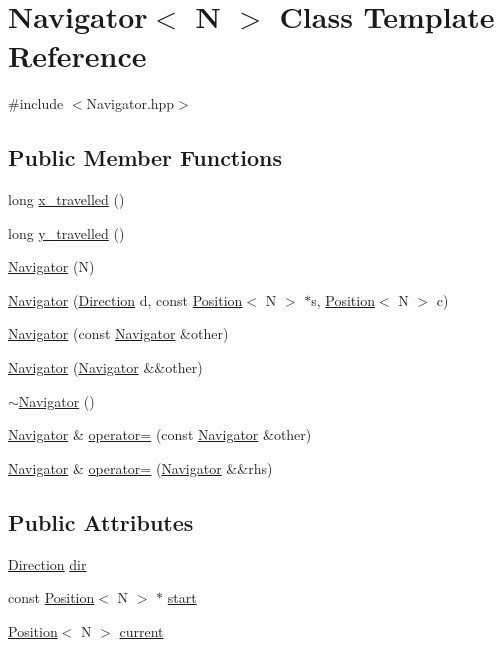 \hypertarget{class_navigator}{\section{Navigator$<$ N $>$ Class Template Reference}
\label{class_navigator}
}


{\ttfamily \#include $<$Navigator.\-hpp$>$}

\subsection*{Public Member Functions}
\begin{DoxyCompactItemize}
\item 
long \hyperlink{class_navigator_a3147fbe6529e9da6614c2f27d1232c01}{x\-\_\-travelled} ()
\item 
long \hyperlink{class_navigator_a6f37a7ef6640339da54970f1cb078a36}{y\-\_\-travelled} ()
\item 
\hyperlink{class_navigator_a89f8f1dfae167567b78ae6d9945bc11f}{Navigator} (N)
\item 
\hyperlink{class_navigator_a2ad3e6df672a38f679d6aa9469aebfcd}{Navigator} (\hyperlink{_position_8hpp_a224b9163917ac32fc95a60d8c1eec3aa}{Direction} d, const \hyperlink{struct_position}{Position}$<$ N $>$ $\ast$s, \hyperlink{struct_position}{Position}$<$ N $>$ c)
\item 
\hyperlink{class_navigator_a1648fd81fa741ad3dde10bfe2ea21013}{Navigator} (const \hyperlink{class_navigator}{Navigator} \&other)
\item 
\hyperlink{class_navigator_ac2abcbe2494ca43a65dcad5463fc006a}{Navigator} (\hyperlink{class_navigator}{Navigator} \&\&other)
\item 
\hyperlink{class_navigator_a5beb4c0f7afa1ff87148530f558059e9}{$\sim$\-Navigator} ()
\item 
\hyperlink{class_navigator}{Navigator} \& \hyperlink{class_navigator_a456fb39b7e4a8053c96a22c04779ddf1}{operator=} (const \hyperlink{class_navigator}{Navigator} \&other)
\item 
\hyperlink{class_navigator}{Navigator} \& \hyperlink{class_navigator_afc9d96cf2145c2470ee796ce7b742f23}{operator=} (\hyperlink{class_navigator}{Navigator} \&\&rhs)
\end{DoxyCompactItemize}
\subsection*{Public Attributes}
\begin{DoxyCompactItemize}
\item 
\hyperlink{_position_8hpp_a224b9163917ac32fc95a60d8c1eec3aa}{Direction} \hyperlink{class_navigator_ad50c667dfd6c342b2e151da0baee29c4}{dir}
\item 
const \hyperlink{struct_position}{Position}$<$ N $>$ $\ast$ \hyperlink{class_navigator_aa691b3f8c7e7161c6fc7f8cf788677c1}{start}
\item 
\hyperlink{struct_position}{Position}$<$ N $>$ \hyperlink{class_navigator_a86f5e1e3480d4baecbc63be8826dc684}{current}
\end{DoxyCompactItemize}


